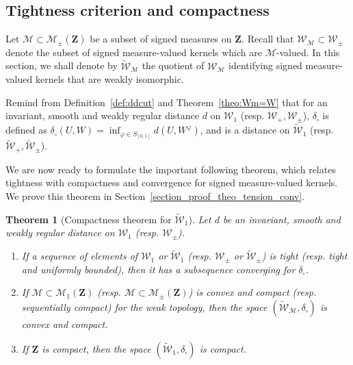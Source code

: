 \documentclass{amsart}
\theoremstyle{plain}
\newtheorem{theo}[Th]{Theorem}
\theoremstyle{definition}
\newcommand{\Space}{\mathbf{Z}}
\newcommand{\signed}{\pm}
\newcommand{\cm}{\mathcal{M}}
\newcommand{\cW}{\mathcal{W}}
\newcommand{\Proba}{\mathcal{M}_1(\Space)}
\newcommand{\SignedMeas}{\mathcal{M}_{\pm}(\Space)}
\newcommand{\Graphon}{\mathcal{W}_1}
\newcommand{\Kernel}{\mathcal{W}_{\signed}}
\newcommand{\Kernelp}{\mathcal{W}_{+}}
\newcommand{\UGraphon}{\widetilde{\mathcal{W}}_1}
\newcommand{\UKernel}{\widetilde{\mathcal{W}}_{\signed}}
\newcommand{\UKernelp}{\widetilde{\mathcal{W}}_{+}}
\newcommand{\InvRelabel}{S_{[0,1]}}
\newcommand{\dd}{\delta_{\square}}
\begin{document}
	

\subsection{Tightness criterion and compactness}
	\label{subsec:tightness}


Let $\cm \subset \SignedMeas$ be  a subset of signed measures on
$\Space$.   Recall that  $\cW_\cm\subset\Kernel$  denote  the subset  of
signed measure-valued  kernels which are $\cm$-valued.   In this section,
we shall denote by $\widetilde{\mathcal{W}}_\cm$ the quotient of
$\mathcal{W}_\cm$ identifying  signed measure-valued kernels  that are
weakly isomorphic.

Remind from Definition~\ref{def:ddcut} and Theorem~\ref{theo:Wm=W}
that for an invariant, smooth and weakly regular distance $d$ 
on $\Graphon$ (resp. $\Kernelp,\Kernel$),
$\dd$ is defined as $\dd(U,W) = \inf_{\varphi \in \InvRelabel} d(U, W^\varphi)$,
and is a distance on $\UGraphon$ (resp. $\UKernelp,\UKernel$).

We are now ready to formulate the important following theorem,
which relates tightness with compactness and convergence
for signed measure-valued kernels.
We prove this theorem in Section~\ref{section_proof_theo_tension_conv}.

  \begin{theo}[Compactness theorem for $\UGraphon$]
    \label{theo_tension_conv}
    Let  $d$ be  an invariant,  smooth  and weakly  regular distance  on
    $\Graphon$ (resp. $\Kernel$). 
    \begin{enumerate}[label=(\roman*)]
    \item\label{it:tension-cv} If a sequence of elements of
      $\Graphon$ or $\UGraphon$ (resp. $\Kernel$ or $\UKernel$)
      is  tight (resp.  tight  and  uniformly bounded),  then  it has  a
        subsequence converging for $\dd$.
   \item\label{it:M-compact}  If  $\cm\subset \Proba$  (resp. $\cm\subset  \SignedMeas$) 
      is convex and compact (resp. sequentially compact)
      for   the   weak   topology,   then   the   space
      $(\widetilde{\mathcal{W}}_\cm, \dd)$ is convex and
      compact. 
    \item\label{it:WG=compact}  If $\Space$  is compact, then the space  $(\UGraphon, \dd)$ is
      compact.
      
 \end{enumerate}
\end{theo}
\end{document}
